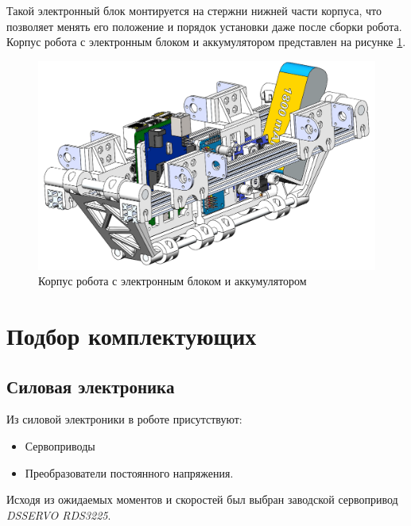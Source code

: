 Такой электронный блок монтируется на стержни нижней части корпуса, что позволяет менять его положение и порядок установки даже после сборки робота. Корпус робота с электронным блоком и аккумулятором представлен на рисунке \ref{fig:full_body}.
\begin{figure}[h]
    \centering
    \includegraphics[scale=0.45]{chapter_mechanics_construction/figure19.png}
    \caption{Корпус робота с электронным блоком и аккумулятором}
    \label{fig:full_body}
\end{figure}

\section{Подбор комплектующих}
\subsection{Силовая электроника}
Из силовой электроники в роботе присутствуют:
\begin{itemize}
    \item Сервоприводы
    \item Преобразователи постоянного напряжения.
\end{itemize}

Исходя из ожидаемых моментов и скоростей был выбран заводской сервопривод \textit{DSSERVO RDS3225}.


